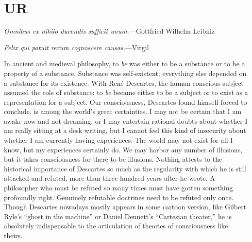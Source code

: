 \documentclass[smallextended]{svjour3}
\begin{document}
\section{UR}\label{sec.UR}
{\leftskip\parindent\small \emph{Omnibus ex nihilo ducendis sufficit unum.}---Gottfried Wilhelm Leibniz\cite{Leibniz}\par
\smallskip\noindent\emph{Felix qui potuit rerum cognoscere causas.}---Virgil\cite{Virgil} \par}\medskip

\noindent In ancient and medieval philosophy, to \emph{be} was either to be a {substance} or to be a property of a substance. Substance was self-existent; everything else depended on a substance for its existence. With Ren\'e Descartes, the human conscious subject assumed the role of substance: to \emph{be} became either to be a subject or to exist as a representation for a subject. Our consciousness, {Descartes} found himself forced to conclude,  is among the world's great certainties. I may not be certain that I am awake now and not dreaming, or I may entertain rational doubts about whether I am really sitting at a desk writing, but I cannot feel this kind of insecurity about whether I am currently having experiences. The world may not exist for all I know, but my {experience}s certainly do. We may harbor any number of illusions, but it takes consciousness for there to be illusions. Nothing attests to the historical importance of Descartes so much as the regularity with which he is still attacked and refuted, more than three hundred years after he wrote. A philosopher who must be refuted so many times must have gotten something profoundly right. Genuinely refutable doctrines need to be refuted only once. Though Descartes nowadays mostly appears in some cartoon version, like {Gilbert Ryle}'s\cite{Ryle49} ``{ghost in the machine}'' or  {Daniel Dennett}'s\cite{Dennett91} ``{Cartesian theater},'' he is absolutely indispensable to the articulation of theories of consciousness like theirs.\cite{Carr99}
\end{document}
